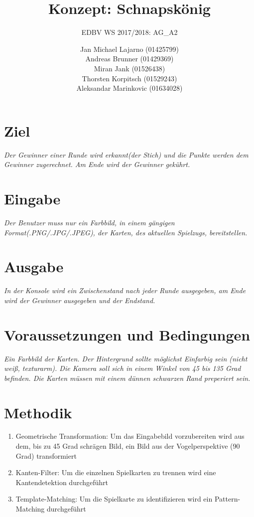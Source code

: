\documentclass[deutsch]{scrartcl}
\begin{document}
\title{Konzept: Schnapskönig} %

\subtitle{EDBV WS 2017/2018: AG\_A2} %


\author{Jan Michael Lajarno (01425799)\\
Andreas Brunner (01429369)\\
Miran Jank (01526438)\\
Thorsten Korpitsch (01529243)\\
Aleksandar Marinkovic (01634028)\\
}




\maketitle



\section{Ziel}
\textit{Der Gewinner einer Runde wird erkannt(der Stich) und die Punkte werden dem Gewinner zugerechnet. Am Ende wird der Gewinner gekührt.}
\section{Eingabe}
\textit{Der Benutzer muss nur ein Farbbild, in einem gängigen Format(.PNG/.JPG/.JPEG), der Karten, des aktuellen Spielzugs, bereitstellen.}
\section{Ausgabe}
\textit{In der Konsole wird ein Zwischenstand nach jeder Runde ausgegeben, am Ende wird der Gewinner ausgegeben und der Endstand.}
\section{Voraussetzungen und Bedingungen}
\textit{Ein Farbbild der Karten. Der Hintergrund sollte möglichst Einfarbig sein (nicht weiß, texturarm). Die Kamera soll sich in einem Winkel von 45 bis 135 Grad befinden. Die Karten müssen mit einem dünnen schwarzen Rand preperiert sein.}
\section{Methodik}
\begin{enumerate}
	\item Geometrische Transformation: Um das Eingabebild vorzubereiten wird aus dem, bis zu 45 Grad schrägen Bild, ein Bild aus der Vogelperspektive (90 Grad) transformiert
	\item Kanten-Filter: Um die einzelnen Spielkarten zu trennen wird eine Kantendetektion durchgeführt
	\item Template-Matching: Um die Spielkarte zu identifizieren wird ein Pattern-Matching durchgeführt
\end{enumerate}
\end{document}
